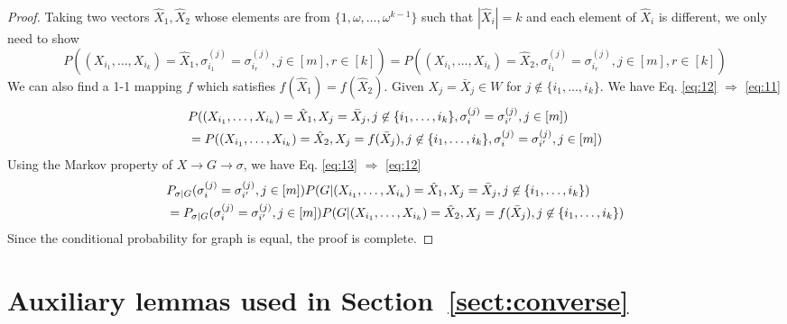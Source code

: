 \documentclass{article}
\begin{document}
\begin{proof}
Taking two vectors $\hat{X}_1,\hat{X}_2$ whose elements are from $\{1,\omega, \dots, \omega^{k-1} \}$ such that $|\hat{X}_i|=k$ and each element of $\hat{X}_i$ is different, we only need to show
\begin{equation}\label{eq:11}
P((X_{i_1}, \dots, X_{i_k}) = \hat{X}_1, \sigma_{i_1}^{(j)}=\sigma_{i_r}^{(j)}, j\in[m], r\in[k]) = P((X_{i_1}, \dots, X_{i_k}) = \hat{X}_2, \sigma_{i_1}^{(j)}=\sigma_{i_r}^{(j)}, j\in[m], r\in[k])
\end{equation}
We can also find a 1-1 mapping $f$ which satisfies $f(\hat{X}_1) = f(\hat{X}_2)$.
Given $X_j = \bar{X}_j \in W$ for $j \not\in \{i_1, \dots, i_k\}$. 
We have Eq. \eqref{eq:12} $\Rightarrow$ \eqref{eq:11}
\begin{align}\label{eq:12}
&P((X_{i_1}, \dots, X_{i_k}) = \hat{X}_1, X_j = \bar{X}_j,j \not\in \{i_1, \dots, i_k\}, \sigma_i^{(j)}=\sigma_{i'}^{(j)}, j\in[m]) \notag\\
& = P((X_{i_1}, \dots, X_{i_k}) = \hat{X}_2, X_j = f(\bar{X}_j),j \not\in \{i_1, \dots, i_k\}, \sigma_i^{(j)} = \sigma_{i'}^{(j)}, j\in[m])
\end{align}
Using the Markov property of $X \to G \to \sigma$, we have Eq. \eqref{eq:13} $\Rightarrow$ \eqref{eq:12}
\begin{align}\label{eq:13}
&P_{\sigma | G}(\sigma_i^{(j)} = \sigma_{i'}^{(j)}, j\in[m])P(G | (X_{i_1}, \dots, X_{i_k}) = \hat{X}_1, X_j = \bar{X}_j,j \not\in \{i_1, \dots, i_k\}) \notag\\
&=P_{\sigma | G} (\sigma_i^{(j)}= \sigma_{i'}^{(j)}, j\in[m])P(G | (X_{i_1}, \dots, X_{i_k}) = \hat{X}_2, X_j = f(\bar{X}_j),j \not\in \{i_1, \dots, i_k\})
\end{align}
Since the conditional probability for graph is equal, the proof is complete.
\end{proof}


\appendix
\section{Auxiliary lemmas used in Section~\ref{sect:converse}}\label{ap:6}
\end{document}
